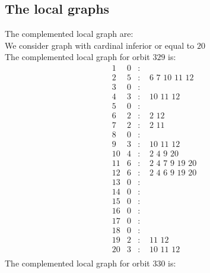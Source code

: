 \documentclass[12pt]{article}
\begin{document}
\subsection{The local graphs}
The complemented local graph are:\\
We consider graph with cardinal inferior or equal to $20$\\
The complemented local graph for orbit $329$ is:
\begin{equation*}
\begin{array}{rrcl}
1&0&:&\\
2&5&:&\,\,6\,\,7\,\,10\,\,11\,\,12\\
3&0&:&\\
4&3&:&\,\,10\,\,11\,\,12\\
5&0&:&\\
6&2&:&\,\,2\,\,12\\
7&2&:&\,\,2\,\,11\\
8&0&:&\\
9&3&:&\,\,10\,\,11\,\,12\\
10&4&:&\,\,2\,\,4\,\,9\,\,20\\
11&6&:&\,\,2\,\,4\,\,7\,\,9\,\,19\,\,20\\
12&6&:&\,\,2\,\,4\,\,6\,\,9\,\,19\,\,20\\
13&0&:&\\
14&0&:&\\
15&0&:&\\
16&0&:&\\
17&0&:&\\
18&0&:&\\
19&2&:&\,\,11\,\,12\\
20&3&:&\,\,10\,\,11\,\,12\\
\end{array}
\end{equation*}
The complemented local graph for orbit $330$ is:
\end{document}
